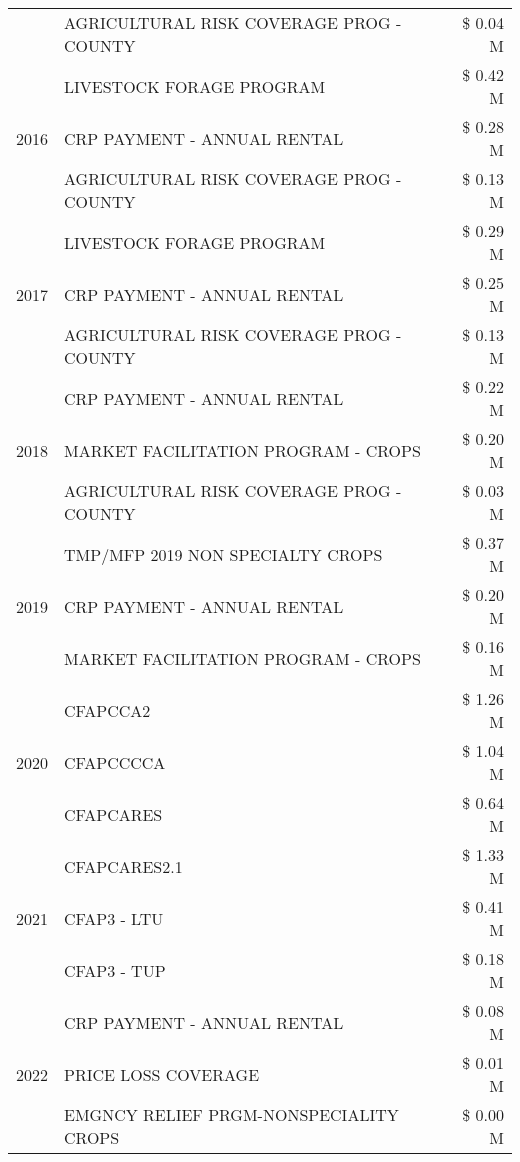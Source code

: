 \begin{tabular}{llr}
 & AGRICULTURAL RISK COVERAGE PROG - COUNTY & \$ 0.04 M \\
\cline{1-3}
\multirow[t]{3}{*}{2016} & LIVESTOCK FORAGE PROGRAM & \$ 0.42 M \\
 & CRP PAYMENT - ANNUAL RENTAL & \$ 0.28 M \\
 & AGRICULTURAL RISK COVERAGE PROG - COUNTY & \$ 0.13 M \\
\cline{1-3}
\multirow[t]{3}{*}{2017} & LIVESTOCK FORAGE PROGRAM & \$ 0.29 M \\
 & CRP PAYMENT - ANNUAL RENTAL & \$ 0.25 M \\
 & AGRICULTURAL RISK COVERAGE PROG - COUNTY & \$ 0.13 M \\
\cline{1-3}
\multirow[t]{3}{*}{2018} & CRP PAYMENT - ANNUAL RENTAL & \$ 0.22 M \\
 & MARKET FACILITATION PROGRAM - CROPS & \$ 0.20 M \\
 & AGRICULTURAL RISK COVERAGE PROG - COUNTY & \$ 0.03 M \\
\cline{1-3}
\multirow[t]{3}{*}{2019} & TMP/MFP 2019 NON SPECIALTY CROPS & \$ 0.37 M \\
 & CRP PAYMENT - ANNUAL RENTAL & \$ 0.20 M \\
 & MARKET FACILITATION PROGRAM - CROPS & \$ 0.16 M \\
\cline{1-3}
\multirow[t]{3}{*}{2020} & CFAPCCA2 & \$ 1.26 M \\
 & CFAPCCCCA & \$ 1.04 M \\
 & CFAPCARES & \$ 0.64 M \\
\cline{1-3}
\multirow[t]{3}{*}{2021} & CFAPCARES2.1 & \$ 1.33 M \\
 & CFAP3 - LTU & \$ 0.41 M \\
 & CFAP3 - TUP & \$ 0.18 M \\
\cline{1-3}
\multirow[t]{3}{*}{2022} & CRP PAYMENT - ANNUAL RENTAL & \$ 0.08 M \\
 & PRICE LOSS COVERAGE & \$ 0.01 M \\
 & EMGNCY RELIEF PRGM-NONSPECIALITY CROPS & \$ 0.00 M \\
\cline{1-3}
\bottomrule
\end{tabular}
